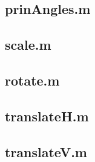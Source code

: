 \subsection{prinAngles.m}




\subsection{scale.m}


\subsection{rotate.m}


\subsection{translateH.m}


\subsection{translateV.m}


